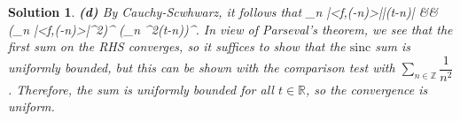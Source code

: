 \documentclass{article} %
\def\eQb#1\eQe{\begin{eqnarray*}#1\end{eqnarray*}}
\theoremstyle{quest}
\newtheorem*{solution}{Solution}
\begin{document}
\begin{solution}
\bigskip

\textbf{(d)} By Cauchy-Scwhwarz, it follows that
\eQb
\sum_{n \in {}}|<f,(\cdot-n)>||(t-n)| &\leq& (\sum_{n \in {}}
|<f,(\cdot -n)>|^2)^{} (\sum_{n \in {}} ^2(t-n))^{}. 
\eQe
In view of Parseval's theorem, we see that the first sum on the RHS converges, so
it suffices to show that the $\text{sinc}$ sum is uniformly bounded, but 
this can be shown with the comparison test with $\sum_{n \in \mathbb{Z}} \dfrac{1}{n^2}$. 
Therefore, the sum is uniformly bounded for all $t \in \mathbb{R}$, so the convergence is uniform.

\end{solution}
\end{document}
